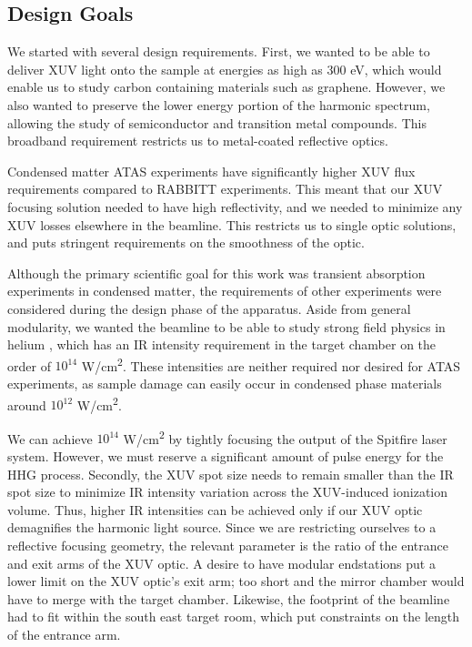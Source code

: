 \subsection{Design Goals}

We started with several design requirements. First, we wanted to be able to deliver XUV light onto the sample at energies as high as 300 eV, which would enable us to study carbon containing materials such as graphene. However, we also wanted to preserve the lower energy portion of the harmonic spectrum, allowing the study of semiconductor and transition metal compounds. This broadband requirement restricts us to metal-coated reflective optics.

Condensed matter ATAS experiments have significantly higher XUV flux requirements compared to RABBITT experiments. This meant that our XUV focusing solution needed to have high reflectivity, and we needed to minimize any XUV losses elsewhere in the beamline. This restricts us to single optic solutions, and puts stringent requirements on the smoothness of the optic.

Although the primary scientific goal for this work was transient absorption experiments in condensed matter, the requirements of other experiments were considered during the design phase of the apparatus. Aside from general modularity, we wanted the beamline to be able to study strong field physics in helium \cite{kiesewetterDynamicsNearThresholdAttosecond2019}, which has an IR intensity requirement in the target chamber on the order of $10^{14}$ W/cm\textsuperscript{2}. These intensities are neither required nor desired for ATAS experiments, as sample damage can easily occur in condensed phase materials around  $10^{12}$ W/cm\textsuperscript{2}.

We can achieve $10^{14}$ W/cm\textsuperscript{2} by tightly focusing the output of the Spitfire laser system. However, we must reserve a significant amount of pulse energy for the HHG process. Secondly, the XUV spot size needs to remain smaller than the IR spot size to minimize IR intensity variation across the XUV-induced ionization volume. Thus, higher IR intensities can be achieved only if our XUV optic demagnifies the harmonic light source. Since we are restricting ourselves to a reflective focusing geometry, the relevant parameter is the ratio of the entrance and exit arms of the XUV optic. A desire to have modular endstations put a lower limit on the XUV optic's exit arm; too short and the mirror chamber would have to merge with the target chamber. Likewise, the footprint of the beamline had to fit within the south east target room, which put constraints on the length of the entrance arm.

